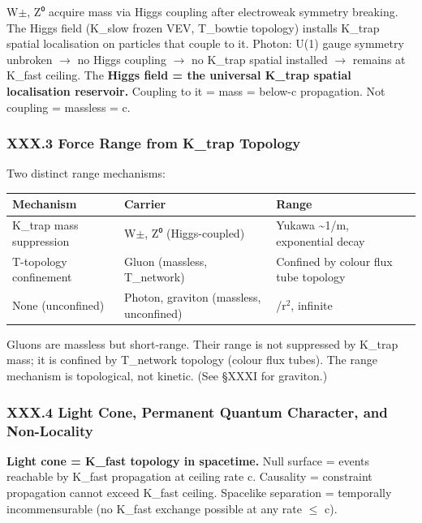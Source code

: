 \documentclass[12pt,a4paper]{article}
\begin{document}
W$\pm$, Z⁰ acquire mass via Higgs coupling after electroweak symmetry breaking. The Higgs field (K\_slow frozen VEV, T\_bowtie topology) installs K\_trap spatial localisation on particles that couple to it. Photon: U(1) gauge symmetry unbroken $\rightarrow$ no Higgs coupling $\rightarrow$ no K\_trap spatial installed $\rightarrow$ remains at K\_fast ceiling. The \textbf{Higgs field = the universal K\_trap spatial localisation reservoir.} Coupling to it = mass = below-c propagation. Not coupling = massless = c.

\subsubsection{XXX.3 Force Range from K\_trap Topology}

Two distinct range mechanisms:

\begin{table}[htbp]
\centering
\small
{}
\begin{tabularx}{\textwidth}{>{\centering\arraybackslash}X >{\centering\arraybackslash}X >{\centering\arraybackslash}X}
\toprule
\rowcolor{gray!25}\textbf{Mechanism} & \textbf{Carrier} & \textbf{Range} \\
\midrule
\rowcolors{1}{white}{gray!10}
K\_trap mass suppression & W$\pm$, Z⁰ (Higgs-coupled) & Yukawa \textasciitilde{}1/m, exponential decay \\
T-topology confinement & Gluon (massless, T\_network) & Confined by colour flux tube topology \\
None (unconfined) & Photon, graviton (massless, unconfined) & 1/r$^{2}$, infinite \\
\bottomrule
\end{tabularx}
\end{table}

Gluons are massless but short-range. Their range is not suppressed by K\_trap mass; it is confined by T\_network topology (colour flux tubes). The range mechanism is topological, not kinetic. (See §XXXI for graviton.)

\subsubsection{XXX.4 Light Cone, Permanent Quantum Character, and Non-Locality}

\textbf{Light cone = K\_fast topology in spacetime.} Null surface = events reachable by K\_fast propagation at ceiling rate c. Causality = constraint propagation cannot exceed K\_fast ceiling. Spacelike separation = temporally incommensurable (no K\_fast exchange possible at any rate $\leq$ c).
\end{document}
